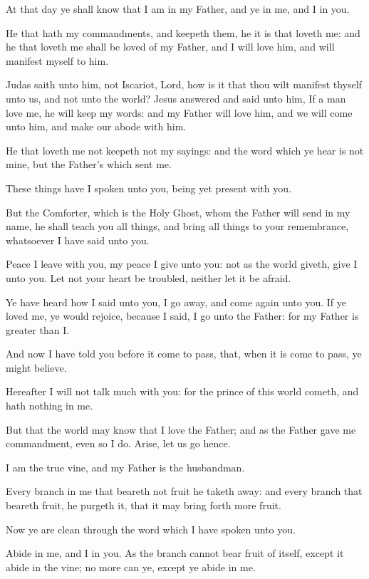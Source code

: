 \Verse At that day ye shall know that I am in my Father, and ye in me, and I in you.

\Verse He that hath my commandments, and keepeth them, he it is that loveth me: and he that loveth me shall be loved of my Father, and I will love him, and will manifest myself to him.

\Verse Judas saith unto him, not Iscariot, Lord, how is it that thou wilt manifest thyself unto us, and not unto the world?  \Verse Jesus answered and said unto him, If a man love me, he will keep my words: and my Father will love him, and we will come unto him, and make our abode with him.

\Verse He that loveth me not keepeth not my sayings: and the word which ye hear is not mine, but the Father's which sent me.

\Verse These things have I spoken unto you, being yet present with you.

\Verse But the Comforter, which is the Holy Ghost, whom the Father will send in my name, he shall teach you all things, and bring all things to your remembrance, whatsoever I have said unto you.

\Verse Peace I leave with you, my peace I give unto you: not as the world giveth, give I unto you. Let not your heart be troubled, neither let it be afraid.

\Verse Ye have heard how I said unto you, I go away, and come again unto you. If ye loved me, ye would rejoice, because I said, I go unto the Father: for my Father is greater than I.

\Verse And now I have told you before it come to pass, that, when it is come to pass, ye might believe.

\Verse Hereafter I will not talk much with you: for the prince of this world cometh, and hath nothing in me.

\Verse But that the world may know that I love the Father; and as the Father gave me commandment, even so I do. Arise, let us go hence.


\Chapter
\Verse I am the true vine, and my Father is the husbandman.

\Verse Every branch in me that beareth not fruit he taketh away: and every branch that beareth fruit, he purgeth it, that it may bring forth more fruit.

\Verse Now ye are clean through the word which I have spoken unto you.

\Verse Abide in me, and I in you. As the branch cannot bear fruit of itself, except it abide in the vine; no more can ye, except ye abide in me.

